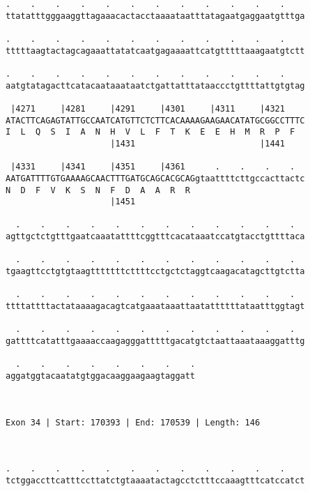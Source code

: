 \documentclass{article}
\begin{document}
\begin{Verbatim}
.    .    .    .    .    .    .    .    .    .    .    .    
ttatatttgggaaggttagaaacactacctaaaataatttatagaatgaggaatgtttga
                                                            
.    .    .    .    .    .    .    .    .    .    .    .    
tttttaagtactagcagaaattatatcaatgagaaaattcatgtttttaaagaatgtctt
                                                            
.    .    .    .    .    .    .    .    .    .    .    .    
aatgtatagacttcatacaataaataatctgattatttataaccctgttttattgtgtag
                                                            
 |4271     |4281     |4291     |4301     |4311     |4321    
ATACTTCAGAGTATTGCCAATCATGTTCTCTTCACAAAAGAAGAACATATGCGGCCTTTC
I  L  Q  S  I  A  N  H  V  L  F  T  K  E  E  H  M  R  P  F  
                     |1431                         |1441    
  
 |4331     |4341     |4351     |4361      .    .    .    .  
AATGATTTTGTGAAAAGCAACTTTGATGCAGCACGCAGgtaattttcttgccacttactc
N  D  F  V  K  S  N  F  D  A  A  R  R                       
                     |1451                                  
  
  .    .    .    .    .    .    .    .    .    .    .    .  
agttgctctgtttgaatcaaatattttcggtttcacataaatccatgtacctgttttaca
                                                            
  .    .    .    .    .    .    .    .    .    .    .    .  
tgaagttcctgtgtaagtttttttcttttcctgctctaggtcaagacatagcttgtctta
                                                            
  .    .    .    .    .    .    .    .    .    .    .    .  
ttttattttactataaaagacagtcatgaaataaattaatattttttataatttggtagt
                                                            
  .    .    .    .    .    .    .    .    .    .    .    .  
gattttcatatttgaaaaccaagagggatttttgacatgtctaattaaataaaggatttg
                                                            
  .    .    .    .    .    .    .    .
aggatggtacaatatgtggacaaggaagaagtaggatt
                                      
                                      
 
Exon 34 | Start: 170393 | End: 170539 | Length: 146



.    .    .    .    .    .    .    .    .    .    .    .    
tctggaccttcatttccttatctgtaaaatactagcctctttccaaagtttcatccatct
                                                            

\end{Verbatim}
\end{document}
